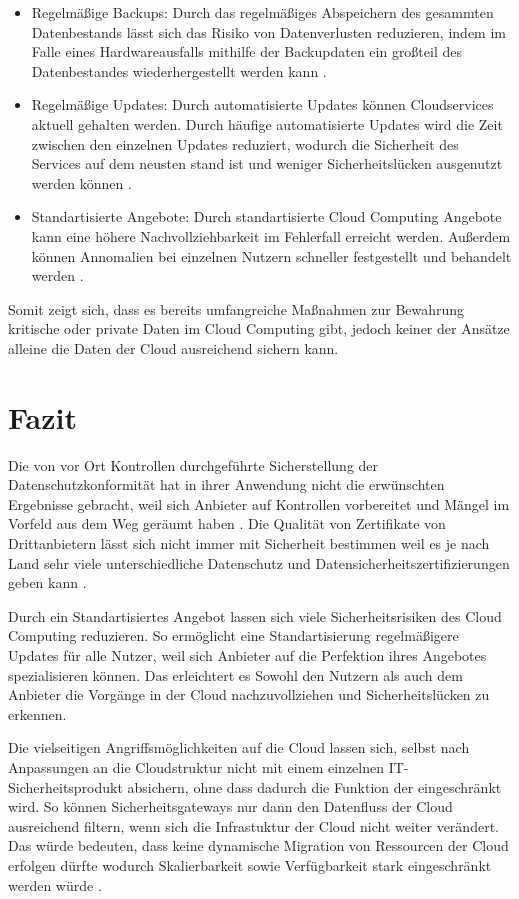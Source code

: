\begin{itemize}
\item 
Regelmäßige Backups: Durch das regelmäßiges Abspeichern des gesammten Datenbestands lässt sich das Risiko von Datenverlusten reduzieren, indem im Falle eines Hardwareausfalls mithilfe der Backupdaten ein großteil des Datenbestandes wiederhergestellt werden kann \cite{wehrhahn-aklender2019}.
\item
Regelmäßige Updates: Durch automatisierte Updates können Cloudservices aktuell gehalten werden. Durch häufige automatisierte Updates wird die Zeit zwischen den einzelnen Updates reduziert, wodurch die Sicherheit des Services auf dem neusten stand ist und weniger Sicherheitslücken ausgenutzt werden können \cite{wehrhahn-aklender2019}.
\item
Standartisierte Angebote: Durch standartisierte Cloud Computing Angebote kann eine höhere Nachvollziehbarkeit im Fehlerfall erreicht werden. Außerdem können Annomalien bei einzelnen Nutzern schneller festgestellt und behandelt werden \cite{wehrhahn-aklender2019}.
\end{itemize}

Somit zeigt sich, dass es bereits umfangreiche Maßnahmen zur Bewahrung kritische oder private Daten im Cloud Computing gibt, jedoch keiner der Ansätze alleine die Daten der Cloud ausreichend sichern kann.


\section{Fazit}
Die von vor Ort Kontrollen durchgeführte Sicherstellung der Datenschutzkonformität hat in ihrer Anwendung nicht die erwünschten Ergebnisse gebracht, weil sich Anbieter auf Kontrollen vorbereitet und Mängel im Vorfeld aus dem Weg geräumt haben \cite{selzer2020}.
Die Qualität von Zertifikate von Drittanbietern lässt sich nicht immer mit Sicherheit bestimmen weil es je nach Land sehr viele unterschiedliche Datenschutz und Datensicherheitszertifizierungen geben kann \cite{selzer2020}.

Durch ein Standartisiertes Angebot lassen sich viele Sicherheitsrisiken des Cloud Computing reduzieren. So ermöglicht eine Standartisierung regelmäßigere Updates für alle Nutzer, weil sich Anbieter auf die Perfektion ihres Angebotes spezialisieren können. Das erleichtert es Sowohl den Nutzern als auch dem Anbieter die Vorgänge in der Cloud nachzuvollziehen und Sicherheitslücken zu erkennen. 

Die vielseitigen Angriffsmöglichkeiten auf die Cloud lassen sich, selbst nach Anpassungen an die Cloudstruktur nicht mit einem einzelnen IT-Sicherheitsprodukt absichern, ohne dass dadurch die Funktion der eingeschränkt wird. So können Sicherheitsgateways nur dann den Datenfluss der Cloud ausreichend filtern, wenn sich die Infrastuktur der Cloud nicht weiter verändert. Das würde bedeuten, dass keine dynamische Migration von Ressourcen der Cloud erfolgen dürfte wodurch Skalierbarkeit sowie Verfügbarkeit stark eingeschränkt werden würde \cite{wehrhahn-aklender2019}.

